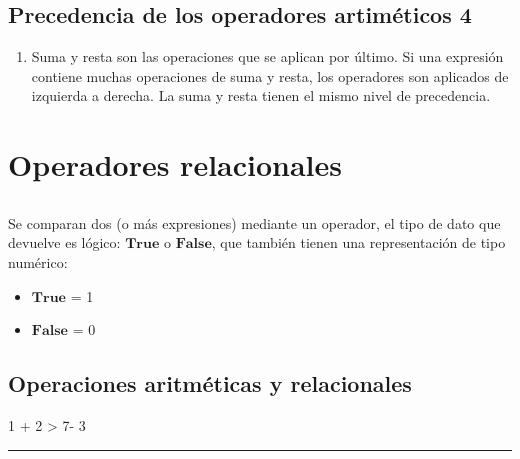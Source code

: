 \documentclass[]{article}
\newenvironment{Shaded}{}{}
\newcommand{\DecValTok}[1]{\textcolor[rgb]{0.25,0.63,0.44}{#1}}
\newcommand{\OperatorTok}[1]{\textcolor[rgb]{0.40,0.40,0.40}{#1}}
\providecommand{\tightlist}{%
  \setlength{\itemsep}{0pt}\setlength{\parskip}{0pt}}
\begin{document}
\subsection{Precedencia de los operadores artiméticos
4}\label{precedencia-de-los-operadores-artimuxe9ticos-4}

\begin{enumerate}
\def\labelenumi{\arabic{enumi}.}
\setcounter{enumi}{3}
\tightlist
\item
  Suma y resta son las operaciones que se aplican por último. Si una
  expresión contiene muchas operaciones de suma y resta, los operadores
  son aplicados de izquierda a derecha. La suma y resta tienen el mismo
  nivel de precedencia.
\end{enumerate}

\section{Operadores relacionales}\label{operadores-relacionales}

\subsection{}\label{section-1}

Se comparan dos (o más expresiones) mediante un operador, el tipo de
dato que devuelve es lógico: \(\textbf{True}\) o \(\textbf{False}\), que
también tienen una representación de tipo numérico:

\begin{itemize}
\tightlist
\item
  \(\textbf{True}\) = 1
\item
  \(\textbf{False}\) = 0
\end{itemize}

\subsection{Operaciones aritméticas y
relacionales}\label{operaciones-aritmuxe9ticas-y-relacionales}

\begin{Shaded}
\begin{Highlighting}[]
\DecValTok{1} \OperatorTok{+} \DecValTok{2} \OperatorTok{>} \DecValTok{7}\OperatorTok{-} \DecValTok{3}
\end{Highlighting}
\end{Shaded}

\begin{center}\rule{0.5\linewidth}{\linethickness}\end{center}
\end{document}
